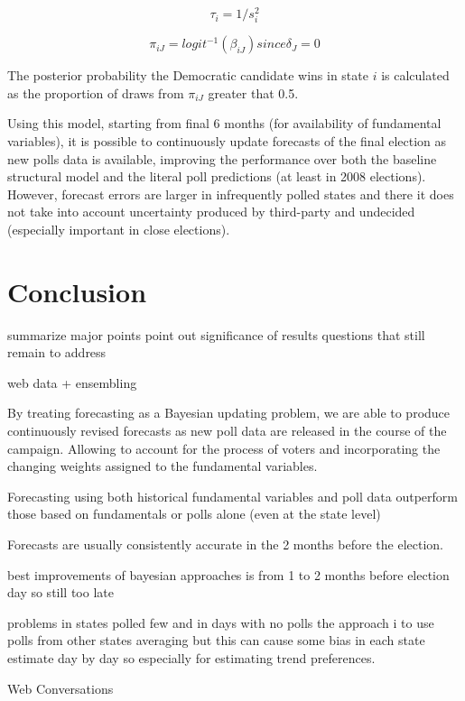 \documentclass[
  12pt]{article}
\begin{document}
\[\tau_i = 1 / s_i^2\]

\[\pi_{iJ} = logit^{-1}(\beta_{iJ}) since \delta_J = 0\]

The posterior probability the Democratic candidate wins in state \(i\)
is calculated as the proportion of draws from \(\pi_{iJ}\) greater that
0.5.

Using this model, starting from final 6 months (for availability of
fundamental variables), it is possible to continuously update forecasts
of the final election as new polls data is available, improving the
performance over both the baseline structural model and the literal poll
predictions (at least in 2008 elections). However, forecast errors are
larger in infrequently polled states and there it does not take into
account uncertainty produced by third-party and undecided (especially
important in close elections).

\hypertarget{sec-conc}{%
\section{Conclusion}\label{sec-conc}}

\citep{riz:2023}

summarize major points point out significance of results questions that
still remain to address

web data + ensembling

By treating forecasting as a Bayesian updating problem, we are able to
produce continuously revised forecasts as new poll data are released in
the course of the campaign. Allowing to account for the process of
voters and incorporating the changing weights assigned to the
fundamental variables.

Forecasting using both historical fundamental variables and poll data
outperform those based on fundamentals or polls alone (even at the state
level)

Forecasts are usually consistently accurate in the 2 months before the
election.

best improvements of bayesian approaches is from 1 to 2 months before
election day so still too late

problems in states polled few and in days with no polls the approach i
to use polls from other states averaging but this can cause some bias in
each state estimate day by day so especially for estimating trend
preferences.

Web Conversations
\end{document}
